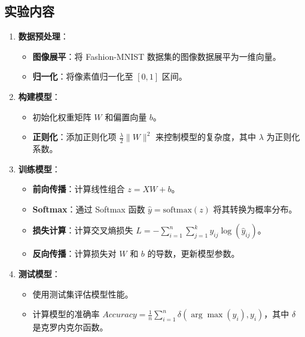 \documentclass[a4paper,12pt]{article}
\begin{document}
\subsection{实验内容}
\begin{enumerate}
	\item \textbf{数据预处理}：
	\begin{itemize}
		\item \textbf{图像展平}：将 Fashion-MNIST 数据集的图像数据展平为一维向量。
		\item \textbf{归一化}：将像素值归一化至 $[0, 1]$ 区间。
	\end{itemize}
	
	\item \textbf{构建模型}：
	\begin{itemize}
		\item 初始化权重矩阵 $W$ 和偏置向量 $b$。
		\item \textbf{正则化}：添加正则化项 $\frac{\lambda}{2} \|W\|^2$ 来控制模型的复杂度，其中 $\lambda$ 为正则化系数。
	\end{itemize}
	
	\item \textbf{训练模型}：
	\begin{itemize}
		\item \textbf{前向传播}：计算线性组合 $z = XW + b$。
		\item \textbf{Softmax}：通过 Softmax 函数 $\hat{y} = \text{softmax}(z)$ 将其转换为概率分布。
		\item \textbf{损失计算}：计算交叉熵损失 $L = -\sum_{i=1}^n \sum_{j=1}^k y_{ij} \log(\hat{y}_{ij})$。
		\item \textbf{反向传播}：计算损失对 $W$ 和 $b$ 的导数，更新模型参数。
	\end{itemize}
	
	\item \textbf{测试模型}：
	\begin{itemize}
		\item 使用测试集评估模型性能。
		\item 计算模型的准确率 $Accuracy = \frac{1}{n} \sum_{i=1}^n \delta(\arg\max(\hat{y}_i), y_i)$，其中 $\delta$ 是克罗内克尔函数。
	\end{itemize}
\end{enumerate}
\end{document}
